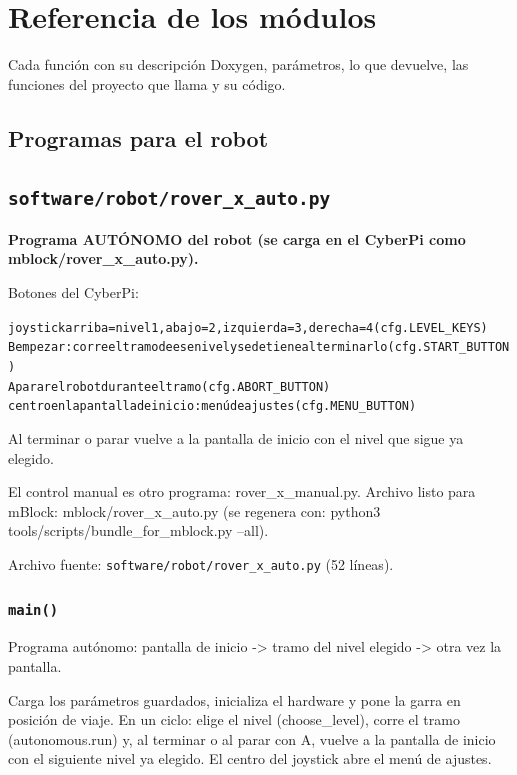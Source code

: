 \section{Referencia de los m\'odulos}
Cada funci\'on con su descripci\'on Doxygen, par\'ametros, lo que devuelve, las funciones del proyecto que llama y su c\'odigo.
\subsection*{Programas para el robot}
\subsection{\texttt{software/robot/rover\_\allowbreak{}x\_\allowbreak{}auto.py}}\label{mod:rover-x-auto}
\textbf{Programa AUTÓNOMO del robot (se carga en el CyberPi como mblock/rover\_x\_auto.py).}

Botones del CyberPi:

{\small\begin{alltt}
joystick   arriba = nivel 1, abajo = 2, izquierda = 3, derecha = 4 (cfg.LEVEL\_KEYS)
B          empezar: corre el tramo de ese nivel y se detiene al terminarlo (cfg.START\_BUTTON)
A          parar el robot durante el tramo (cfg.ABORT\_BUTTON)
centro     en la pantalla de inicio: menú de ajustes (cfg.MENU\_BUTTON)
\end{alltt}}
Al terminar o parar vuelve a la pantalla de inicio con el nivel que sigue ya elegido.

El control manual es otro programa: rover\_x\_manual.py. Archivo listo para mBlock: mblock/rover\_x\_auto.py (se regenera con: python3 tools/scripts/bundle\_for\_mblock.py --all).

\noindent Archivo fuente: \texttt{software/robot/rover\_\allowbreak{}x\_\allowbreak{}auto.py} (52 l\'ineas).

\subsubsection{\texttt{main()}}\label{fn:rover_x_auto:main}
\noindent Programa autónomo: pantalla de inicio -> tramo del nivel elegido -> otra vez la pantalla.

Carga los parámetros guardados, inicializa el hardware y pone la garra en posición de viaje. En un ciclo: elige el nivel (choose\_level), corre el tramo (autonomous.run) y, al terminar o al parar con A, vuelve a la pantalla de inicio con el siguiente nivel ya elegido. El centro del joystick abre el menú de ajustes.

